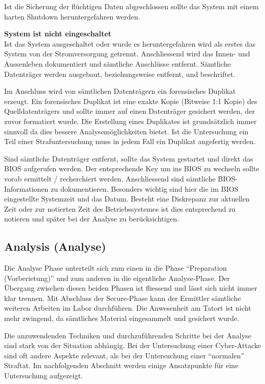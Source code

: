 Ist die Sicherung der flüchtigen Daten abgeschlossen sollte das System mit einem harten Shutdown heruntergefahren werden.


\textbf{System ist nicht eingeschaltet}\\
Ist das System ausgeschaltet oder wurde es heruntergefahren wird als erstes das System von der Stromversorgung getrennt. Anschliessend wird das Innen- und Aussenleben dokumentiert und sämtliche Anschlüsse entfernt. Sämtliche Datenträger werden ausgebaut, beziehungsweise entfernt, und beschriftet.

Im Anschluss wird von sämtlichen Datenträgern ein forensisches Duplikat erzeugt. Ein forensisches Duplikat ist eine exakte Kopie (Bitweise 1:1 Kopie) des Quelldatenträgers und sollte immer auf einen Datenträger gesichert werden, der zuvor formatiert wurde. Die Erstellung eines Duplikates ist grundsätzlich immer sinnvoll da dies bessere Analysemöglichkeiten bietet. Ist die Untersuchung ein Teil einer Strafuntersuchung muss in jedem Fall ein Duplikat angefertig werden.

Sind sämtliche Datenträger entfernt, sollte das System gestartet und direkt das BIOS aufgerufen werden. Der entsprechende Key um ins BIOS zu wechseln sollte vorab ermittelt / recherchiert werden. Anschliessend sind sämtliche BIOS-Informationen zu dokumentieren. Besonders wichtig sind hier die im BIOS eingestellte Systemzeit und das Datum. Besteht eine Diskrepanz zur aktuellen Zeit oder zur notierten Zeit des Betriebssystemes ist dies entsprechend zu notieren und später bei der Analyse zu berücksichtigen.

\subsection{Analysis (Analyse)}
Die Analyse Phase unterteilt sich zum einen in die Phase "`Preparation (Vorberietung)"' und zum anderen in die eigentliche Analyse-Phase. Der Übergang zwischen diesen beiden Phasen ist fliessend und lässt sich nicht immer klar trennen. Mit Abschluss der Secure-Phase kann der Ermittler sämtliche weiteren Arbeiten im Labor durchführen. Die Anwesenheit am Tatort ist nicht mehr zwingend, da sämtliches Material eingesammelt und gesichert wurde.

Die anzuwendenden Techniken und durchzuführenden Schritte bei der Analyse sind stark von der Situation abhängig. Bei der Untersuchung einer Cyber-Attacke sind oft andere Aspekte relevant, als bei der Untersuchung einer "`normalen"' Straftat. Im nachfolgenden Abschnitt werden einige Ansatzpunkte für eine Untersuchung aufgezeigt.

